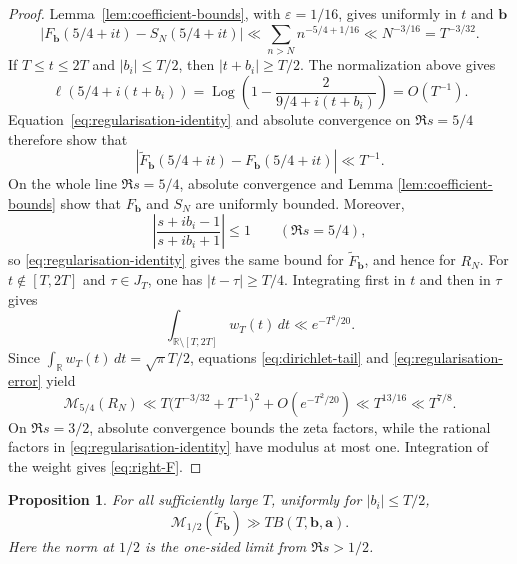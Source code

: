 \documentclass[11pt]{amsart}
\numberwithin{equation}{section}
\theoremstyle{plain}
\newtheorem{prop}[lem]{Proposition}
\newcommand{\R}{\mathbb{R}}
\renewcommand{\epsilon}{\varepsilon}
\renewcommand{\tilde}{\widetilde}
\renewcommand{\le}{\leqslant}
\renewcommand{\ge}{\geqslant}
\begin{document}
\begin{proof}
Lemma~\ref{lem:coefficient-bounds}, with $\epsilon=1/16$, gives uniformly
in $t$ and $\mathbf b$
\begin{equation}\label{eq:dirichlet-tail}
|F_{\mathbf b}(5/4+it)-S_N(5/4+it)|
\ll\sum_{n>N}n^{-5/4+1/16}
\ll N^{-3/16}=T^{-3/32}.
\end{equation}
If $T\le t\le2T$ and $|b_i|\le T/2$, then
$|t+b_i|\ge T/2$.  The normalization above gives
\begin{equation*}
\ell(5/4+i(t+b_i))
=\operatorname{Log}\left(1-\frac{2}{9/4+i(t+b_i)}\right)
=O(T^{-1}).
\end{equation*}
Equation~\eqref{eq:regularisation-identity} and absolute convergence on
$\Re s=5/4$ therefore show that
\begin{equation}\label{eq:regularisation-error}
|\tilde F_{\mathbf b}(5/4+it)-F_{\mathbf b}(5/4+it)|
\ll T^{-1}.
\end{equation}
On the whole line $\Re s=5/4$, absolute convergence and Lemma
\ref{lem:coefficient-bounds} show that $F_{\mathbf b}$ and $S_N$ are
uniformly bounded.  Moreover,
\begin{equation*}
\left|\frac{s+ib_i-1}{s+ib_i+1}\right|\le1
\qquad(\Re s=5/4),
\end{equation*}
so \eqref{eq:regularisation-identity} gives the same bound for
$\tilde F_{\mathbf b}$, and hence for $R_N$.  For $t\notin[T,2T]$ and
$\tau\in J_T$, one has $|t-\tau|\ge T/4$.  Integrating first in $t$ and
then in $\tau$ gives
\begin{equation*}
\int_{\R\setminus[T,2T]}w_T(t)\,dt\ll e^{-T^2/20}.
\end{equation*}
Since
$\int_{\R}w_T(t)\,dt=\sqrt\pi T/2$, equations
\eqref{eq:dirichlet-tail} and \eqref{eq:regularisation-error} yield
\begin{equation*}
\mathcal M_{5/4}(R_N)
\ll T\bigl(T^{-3/32}+T^{-1}\bigr)^2+O(e^{-T^2/20})
\ll T^{13/16}
\ll T^{7/8}.
\end{equation*}
On $\Re s=3/2$, absolute convergence bounds the zeta factors, while the
rational factors in \eqref{eq:regularisation-identity} have modulus at
most one.  Integration of the weight gives \eqref{eq:right-F}.
\end{proof}

\begin{prop}\label{prop:weighted-lower}
For all sufficiently large $T$, uniformly for $|b_i|\le T/2$,
\begin{equation}\label{eq:weighted-lower}
\mathcal M_{1/2}(\tilde F_{\mathbf b})
\gg T B(T,\mathbf b,\mathbf a).
\end{equation}
Here the norm at $1/2$ is the one-sided limit from $\Re s>1/2$.
\end{prop}
\end{document}
